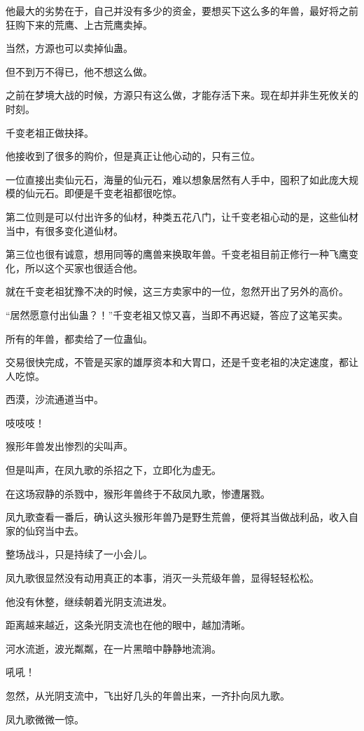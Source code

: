 \begin{this_body}
他最大的劣势在于，自己并没有多少的资金，要想买下这么多的年兽，最好将之前狂购下来的荒鹰、上古荒鹰卖掉。

当然，方源也可以卖掉仙蛊。

但不到万不得已，他不想这么做。

之前在梦境大战的时候，方源只有这么做，才能存活下来。现在却并非生死攸关的时刻。

千变老祖正做抉择。

他接收到了很多的购价，但是真正让他心动的，只有三位。

一位直接出卖仙元石，海量的仙元石，难以想象居然有人手中，囤积了如此庞大规模的仙元石。即便是千变老祖都很吃惊。

第二位则是可以付出许多的仙材，种类五花八门，让千变老祖心动的是，这些仙材当中，有很多变化道仙材。

第三位也很有诚意，想用同等的鹰兽来换取年兽。千变老祖目前正修行一种飞鹰变化，所以这个买家也很适合他。

就在千变老祖犹豫不决的时候，这三方卖家中的一位，忽然开出了另外的高价。

“居然愿意付出仙蛊？！”千变老祖又惊又喜，当即不再迟疑，答应了这笔买卖。

所有的年兽，都卖给了一位蛊仙。

交易很快完成，不管是买家的雄厚资本和大胃口，还是千变老祖的决定速度，都让人吃惊。

西漠，沙流通道当中。

吱吱吱！

猴形年兽发出惨烈的尖叫声。

但是叫声，在凤九歌的杀招之下，立即化为虚无。

在这场寂静的杀戮中，猴形年兽终于不敌凤九歌，惨遭屠戮。

凤九歌查看一番后，确认这头猴形年兽乃是野生荒兽，便将其当做战利品，收入自家的仙窍当中去。

整场战斗，只是持续了一小会儿。

凤九歌很显然没有动用真正的本事，消灭一头荒级年兽，显得轻轻松松。

他没有休整，继续朝着光阴支流进发。

距离越来越近，这条光阴支流也在他的眼中，越加清晰。

河水流逝，波光粼粼，在一片黑暗中静静地流淌。

吼吼！

忽然，从光阴支流中，飞出好几头的年兽出来，一齐扑向凤九歌。

凤九歌微微一惊。


\end{this_body}
